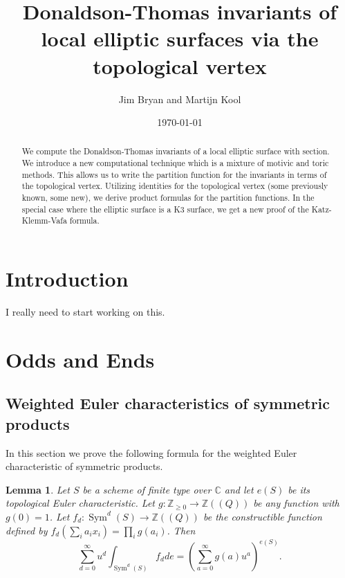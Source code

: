 \documentclass{amsart}
\title{Donaldson-Thomas invariants of local elliptic surfaces via the topological vertex}
\author{Jim Bryan and Martijn Kool}
\date{\today}
\newtheorem{lemma}[theorem]{Lemma}
\theoremstyle{definition}
\newcommand{\CC} {\mathbb{C}}          %
\newcommand{\ZZ} {\mathbb{Z}}		%
\newcommand{\Sym}{\operatorname{Sym}}
\begin{document}
\begin{abstract}
We compute the Donaldson-Thomas invariants of a local elliptic surface
with section. We introduce a new computational technique which is a
mixture of motivic and toric methods. This allows us to write the
partition function for the invariants in terms of the topological
vertex. Utilizing identities for the topological vertex (some
previously known, some new), we derive product formulas for the
partition functions. In the special case where the elliptic surface is
a K3 surface, we get a new proof of the Katz-Klemm-Vafa formula.
\end{abstract}

\maketitle 





\section{Introduction}

I really need to start working on this.



   

\appendix
\section{Odds and Ends}\label{appendix: odds and ends}


\subsection{Weighted Euler characteristics of symmetric products}

In this section we prove the following formula for the weighted Euler
characteristic of symmetric products.

\begin{lemma}\label{lem: formula for euler char of sym products}
Let $S$ be a scheme of finite type over $\CC $ and let $e (S)$ be its
topological Euler characteristic. Let $g:\ZZ _{\geq 0}\to \ZZ ((Q))$
be any function with $g (0)=1$. Let $f_{d}:\Sym ^{d} (S)\to \ZZ ((Q))$
be the constructible function defined by $f_{d} (\sum_{i}
a_{i}x_{i})=\prod _{i}g (a_{i})$. Then
\[
\sum _{d=0}^{\infty } u^{d} \int _{\Sym ^{d} (S)} f_{d} de =
\left(\sum _{a=0}^{\infty }g (a) u^{a} \right)^{e (S)}.
\]
\end{lemma}
\end{document}
